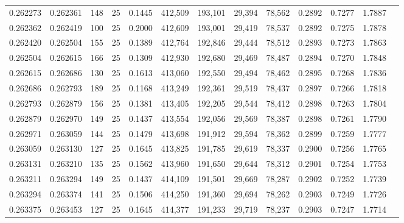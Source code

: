 \begin{tabular}{rrrrrrrrrrrrr}
0.262273 & 0.262361 &   148 &  25 &                                     0.1445 & 412,509 & 193,101 &  29,394 &  78,562 & 0.2892 & 0.7277 & 1.7887 \\
0.262362 & 0.262419 &   100 &  25 &                                     0.2000 & 412,609 & 193,001 &  29,419 &  78,537 & 0.2892 & 0.7275 & 1.7878 \\
0.262420 & 0.262504 &   155 &  25 &                                     0.1389 & 412,764 & 192,846 &  29,444 &  78,512 & 0.2893 & 0.7273 & 1.7863 \\
0.262504 & 0.262615 &   166 &  25 &                                     0.1309 & 412,930 & 192,680 &  29,469 &  78,487 & 0.2894 & 0.7270 & 1.7848 \\
0.262615 & 0.262686 &   130 &  25 &                                     0.1613 & 413,060 & 192,550 &  29,494 &  78,462 & 0.2895 & 0.7268 & 1.7836 \\
0.262686 & 0.262793 &   189 &  25 &                                     0.1168 & 413,249 & 192,361 &  29,519 &  78,437 & 0.2897 & 0.7266 & 1.7818 \\
0.262793 & 0.262879 &   156 &  25 &                                     0.1381 & 413,405 & 192,205 &  29,544 &  78,412 & 0.2898 & 0.7263 & 1.7804 \\
0.262879 & 0.262970 &   149 &  25 &                                     0.1437 & 413,554 & 192,056 &  29,569 &  78,387 & 0.2898 & 0.7261 & 1.7790 \\
0.262971 & 0.263059 &   144 &  25 &                                     0.1479 & 413,698 & 191,912 &  29,594 &  78,362 & 0.2899 & 0.7259 & 1.7777 \\
0.263059 & 0.263130 &   127 &  25 &                                     0.1645 & 413,825 & 191,785 &  29,619 &  78,337 & 0.2900 & 0.7256 & 1.7765 \\
0.263131 & 0.263210 &   135 &  25 &                                     0.1562 & 413,960 & 191,650 &  29,644 &  78,312 & 0.2901 & 0.7254 & 1.7753 \\
0.263211 & 0.263294 &   149 &  25 &                                     0.1437 & 414,109 & 191,501 &  29,669 &  78,287 & 0.2902 & 0.7252 & 1.7739 \\
0.263294 & 0.263374 &   141 &  25 &                                     0.1506 & 414,250 & 191,360 &  29,694 &  78,262 & 0.2903 & 0.7249 & 1.7726 \\
0.263375 & 0.263453 &   127 &  25 &                                     0.1645 & 414,377 & 191,233 &  29,719 &  78,237 & 0.2903 & 0.7247 & 1.7714 \\

\end{tabular}
